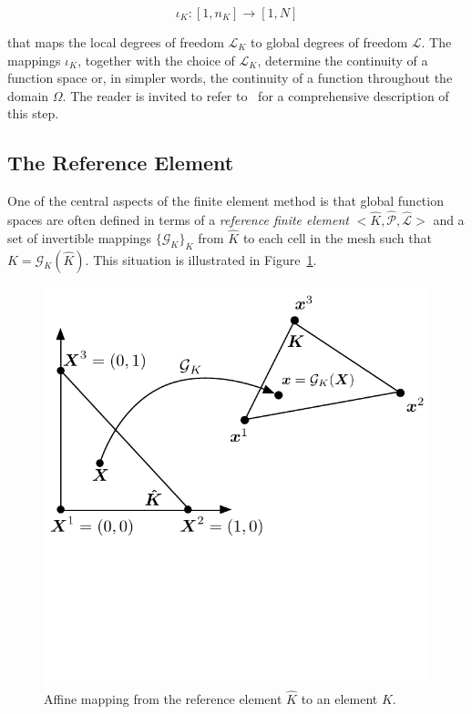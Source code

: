 \begin{equation}
\iota_K : [1,n_K] \rightarrow [1,N]
\end{equation}

that maps the local degrees of freedom $\mathcal{L}_K$ to global degrees of freedom $\mathcal{L}$. The mappings $\iota_K$, together with the choice of $\mathcal{L}_K$, determine the continuity of a function space or, in simpler words, the continuity of a function throughout the domain $\Omega$. The reader is invited to refer to~\cite{Fenics} for a comprehensive description of this step.

\subsection{The Reference Element}
\label{sec:bkg:refel}
One of the central aspects of the finite element method is that global function spaces are often defined in terms of a {\em reference finite element} ${<}\hat{K}, \hat{\mathcal{P}}, \hat{\mathcal{L}}{>}$ and a set of invertible mappings $\lbrace \mathcal{G}_K\rbrace_{K}$ from $\hat{K}$ to each cell in the mesh such that $K = \mathcal{G}_K(\hat{K})$.  This situation is illustrated in Figure~\ref{fig:bkg:reference-el}.

\begin{figure}
\begin{CenteredBox}
\includegraphics[scale=0.8]{background/figures/reference-element}
\end{CenteredBox}
\caption{Affine mapping from the reference element $\hat{K}$ to an element $K$.}
\label{fig:bkg:reference-el}
\end{figure}

